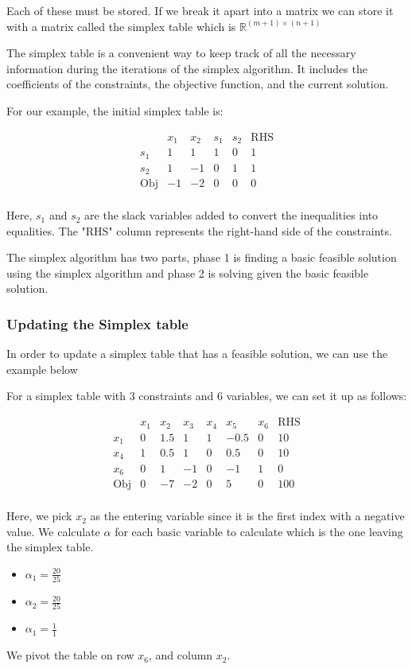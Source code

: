Each of these must be stored.
If we break it apart into a matrix we can store it with a matrix called the simplex table which is $\mathbb{R}^{(m+1)\times (n+1)}$

The simplex table is a convenient way to keep track of all the necessary information during the iterations of the simplex algorithm. It includes the coefficients of the constraints, the objective function, and the current solution.

For our example, the initial simplex table is:

\[
\begin{array}{c|cccc|c}
 & x_1 & x_2 & s_1 & s_2 & \text{RHS} \\
\hline
s_1 & 1 & 1 & 1 & 0 & 1 \\
s_2 & 1 & -1 & 0 & 1 & 1 \\
\hline
\text{Obj} & -1 & -2 & 0 & 0 & 0 \\
\end{array}
\]

Here, $s_1$ and $s_2$ are the slack variables added to convert the inequalities into equalities. The "RHS" column represents the right-hand side of the constraints.

The simplex algorithm has two parts, phase 1 is finding a basic feasible solution using the simplex algorithm and phase 2 is solving given the basic feasible solution.
\subsubsection{Updating the Simplex table}
In order to update a simplex table that has a feasible solution, we can use the example below

For a simplex table with 3 constraints and 6 variables, we can set it up as follows:

\[ 
\begin{array}{c|ccccccc}
 & x_1 & x_2 & x_3 & x_4 & x_5 & x_6 & \text{RHS} \\
\hline
x_1 & 0 & 1.5 & 1 & 1 & -0.5 & 0 & 10 \\
x_4 & 1 & 0.5 & 1 & 0 & 0.5 & 0 &  10 \\
x_6 & 0 & 1 & -1 & 0 & -1 & 1 & 0 \\
\hline
\text{Obj} & 0 & -7 & -2 & 0 & 5 & 0 & 100 \\
\end{array}
\]

Here, we pick $x_2$ as the entering variable since it is the first index with a negative value.
We calculate $\alpha$ for each basic variable to calculate which is the one leaving the simplex table.
\begin{itemize}
  \item $\alpha_1 = \frac{20}{25}$
  \item $\alpha_2 = \frac{20}{25}$
  \item $\alpha_1 = \frac{1}{1}$
\end{itemize}
We pivot the table on row $x_6$, and column $x_2$.


